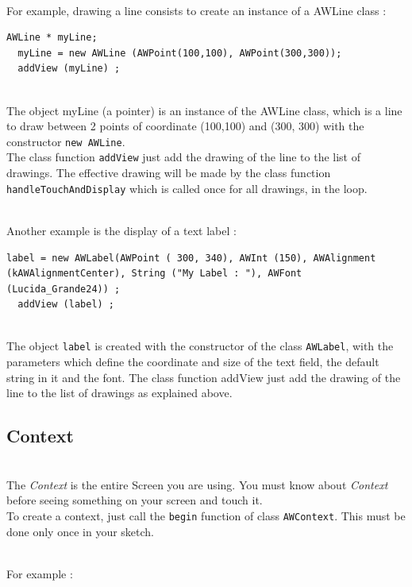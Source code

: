 \documentclass[a4paper,11pt]{extarticle}
\begin{document}
~\\For example, drawing a line consists to create an instance of a AWLine class  :

\begin{lstlisting}[language=Arduinonl]
AWLine * myLine;
  myLine = new AWLine (AWPoint(100,100), AWPoint(300,300)); 
  addView (myLine) ;
 \end{lstlisting}


~\\ The object myLine (a pointer) is an instance of the AWLine class, which is a line to draw between 2 points of coordinate (100,100) and (300, 300) with the constructor \texttt{new AWLine}.
~\\ The class function \texttt{addView} just add the drawing of the line to the list of drawings. The effective drawing will be made by the class function \texttt{handleTouchAndDisplay} which is called once for all drawings, in the loop.

~\\ Another example is the display of a text label :

\begin{lstlisting}[language=Arduinonl]
  label = new AWLabel(AWPoint ( 300, 340), AWInt (150), AWAlignment (kAWAlignmentCenter), String ("My Label : "), AWFont (Lucida_Grande24)) ;
  addView (label) ;
\end{lstlisting}

~\\ The object \texttt{label} is created with the constructor of the class \texttt{AWLabel}, with the parameters which define the coordinate and size of the text field, the default string in it and the font. The class function addView just add the drawing of the line to the list of drawings as explained above.


\newpage
\subsection{Context}

~\\ The \emph{Context} is the entire Screen you are using. You must know about \emph{Context} before seeing something on your screen and touch it. 
~\\ To create a context, just call the \texttt{begin} function of class \texttt{AWContext}. This must be done only once in your sketch.

~\\ For example :
\end{document}
